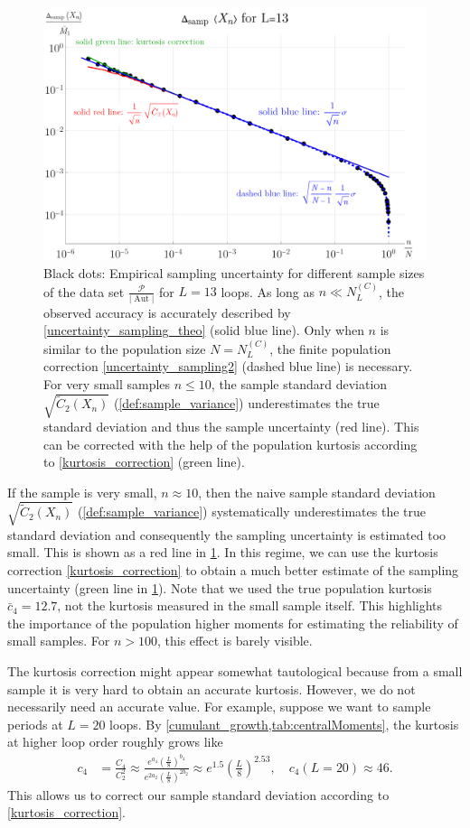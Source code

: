 \documentclass[11pt,a4paper]{article}
\newcommand{\abs}[1]{\lvert #1 \rvert}
\newcommand{\period}{\mathcal P}
\newcommand{\Aut}{\operatorname{Aut}}
\renewcommand{\|}{\rule[-0.4ex]{0.2ex}{1.2em}}
\begin{document}
\begin{figure}[htb]
	\centering
	\includegraphics[width=.75\linewidth]{sample_uncertainty}
	\caption{Black dots: Empirical sampling uncertainty for different sample sizes of the data set $\frac{\period}{\abs{\Aut}}$ for $L=13$ loops. As long as $n \ll N^{(C)}_L$, the observed accuracy is accurately described by \cref{uncertainty_sampling_theo} (solid blue line). Only when $n$ is similar to the population size $N=N^{(C)}_L$, the finite population correction \cref{uncertainty_sampling2} (dashed blue line) is necessary. For very small samples $n \leq 10$, the sample standard deviation $\sqrt{\tilde C_2(X_n)}$ (\cref{def:sample_variance}) underestimates the true standard deviation and thus the sample uncertainty (red line). This can be corrected with the help of the population kurtosis according to \cref{kurtosis_correction} (green line). }
	\label{fig:sample_uncertainty}
\end{figure}


If the sample is very small, $n \approx 10$, then the naive sample standard deviation $\sqrt{\tilde C_2(X_n)}$  (\cref{def:sample_variance}) systematically underestimates the true standard deviation and consequently the sampling uncertainty is estimated too small. This is shown as a red line in \cref{fig:sample_uncertainty}. In this regime, we can use the kurtosis correction \cref{kurtosis_correction} to obtain a much better estimate of the sampling uncertainty (green line in  \cref{fig:sample_uncertainty}). Note that we used the true population kurtosis $\bar c_4 = 12.7$, not the kurtosis measured in the small sample itself. This highlights the importance of the population higher moments for estimating the reliability of small samples. For $n > 100$, this effect is barely visible.



The kurtosis correction might appear somewhat tautological because from a small sample it is very hard to obtain an accurate kurtosis. However, we do not necessarily need an accurate value. For example, suppose we want to sample periods at $L=20$ loops. By \cref{cumulant_growth,tab:centralMoments}, the kurtosis at higher loop order roughly grows like
\begin{align*}
c_4 &= \frac{C_4}{C_2^2} \approx \frac{e^{a_4} \left( \frac L 8 \right) ^{b_4}}{e^{2 a_2} \left( \frac L 8 \right) ^{2 b_2}} \approx e^{1.5} \left( \frac L 8 \right) ^{2.53}, \quad c_4(L=20) \approx 46.
\end{align*}
This allows us to correct our sample standard deviation according to \cref{kurtosis_correction}. 
\end{document}
